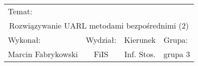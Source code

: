 \documentclass[12pt,a4paper]{article}
\begin{document}
 
\large
\begin{tabular}{|c|c|c|c|}
\hline
\multicolumn{4}{|l|}{Temat:}\\
\multicolumn{4}{|c|}{Rozwiązywanie UARL metodami bezpośrednimi (2)}\\
\hline
\multicolumn{1}{|l}{Wykonał:}&\multicolumn{1}{|l}{Wydział:}&\multicolumn{1}{|c}{Kierunek}&\multicolumn{1}{|l|}{Grupa:}\\
Marcin Fabrykowski&FiIS&Inf. Stos.&grupa 3\\
\hline
\end{tabular}
\normalsize
\vspace{2cm}
\end{document}
